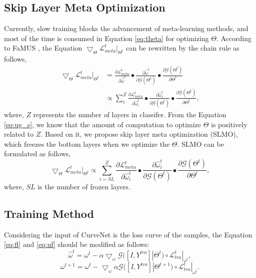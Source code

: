 \documentclass[letterpaper]{article} %
\begin{document}
\subsection{Skip Layer Meta Optimization}
Currently, slow training blocks the advancement of meta-learning methods, and most of the time is consumed in Equation \ref{eq:theta} for optimizing $\Theta$.
According to FaMUS \cite{Xu2021FaMUS}, the Equation $\bigtriangledown_\Theta \mathcal{L}^{t}_{meta}|_{\Theta^{t}}$ can be rewritten by the chain rule as follows,
\begin{equation}
\begin{split}
\bigtriangledown_\Theta \mathcal{L}^{t}_{meta}|_{\Theta^{t}}  & = \frac{\partial \mathcal{L}^{t}_{meta} }{\partial \hat{\omega}^t} \bullet \frac{\partial \hat{\omega}^t}{\partial \mathcal{G}(\Theta^{t})} \bullet \frac{\partial \mathcal{G}(\Theta^{t})}{\partial \Theta^{t}} \\
& \varpropto \sum_i^Z \frac{\partial \mathcal{L}^{t}_{meta} }{\partial \hat{\omega}^t_i} \bullet \frac{\partial \hat{\omega}^t_i}{\partial \mathcal{G}(\Theta^{t})} \bullet \frac{\partial \mathcal{G}(\Theta^{t})}{\partial \Theta^{t}},
\end{split}
\label{eq:ug_s}
\end{equation}
where, $Z$ represents the number of layers in classifer.
From the Equation \ref{eq:ug_s}, we know that the amount of computation to optimize $\Theta$ is positively related to $Z$.
Based on it, we propose skip layer meta optimization (SLMO), which freezes the bottom layers when we optimize the $\Theta$.
SLMO can be formulated as follows,
\begin{equation}
\bigtriangledown_\Theta \mathcal{L}^{t}_{meta}|_{\Theta^{t}}   \varpropto \sum_{i=SL}^Z \frac{\partial \mathcal{L}^{t}_{meta} }{\partial \hat{\omega}^t_i} \bullet \frac{\partial \hat{\omega}^t_i}{\partial \mathcal{G}(\Theta^{t})} \bullet \frac{\partial \mathcal{G}(\Theta^{t})}{\partial \Theta^{t}},
\label{eq:ug_sK}
\end{equation}
where, $SL$ is the number of frozen layers.

\subsection{Training Method}

Considering the input of CurveNet is the loss curve of the samples, the Equation \ref{eq:fl} and \ref{eq:uf} should be modified as follows:
\begin{equation}
\hat{\omega}^{t} = \omega^{t} - \alpha \bigtriangledown_\omega \mathcal{G}([I, Y^{tra}]|\Theta^{t}) \circ \mathcal{L}^{t}_{tra}|_{\omega^{t}},
\label{eq:fl_our}
\end{equation}
\begin{equation}
\omega^{t+1} = \omega^{t} - \bigtriangledown_\omega \alpha \mathcal{G}([I, Y^{tra}]|\Theta^{t+1}) \circ \mathcal{L}^{t}_{tra}|_{\omega^{t}}.
\label{eq:uf_our}
\end{equation}
\end{document}
